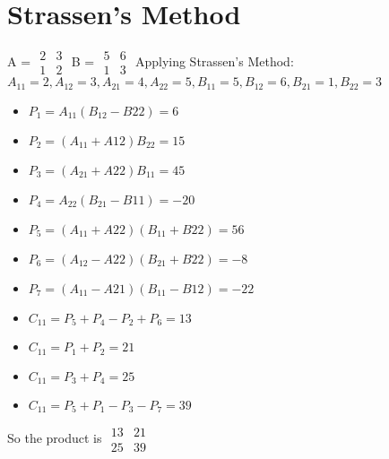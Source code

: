 \documentclass[12pt]{article}
\begin{document}
\section{Strassen’s Method}
A = $\begin{matrix}
    2 & 3 \\ 1 & 2
\end{matrix}$  
B = $\begin{matrix}
    5 & 6 \\ 1 & 3
\end{matrix}$
\newline
Applying Strassen's Method: $A_{11}=2, A_{12}=3, A_{21}=4, A_{22}=5, B_{11}=5, B_{12}=6, B_{21}=1, B_{22}=3$
\begin{itemize}
    \item $P_1=A_{11}(B_{12}-B{22})=6$
    \item $P_2=(A_{11}+A{12})B_{22}=15$
    \item $P_3=(A_{21}+A{22})B_{11}=45$
    \item $P_4=A_{22}(B_{21}-B{11})=-20$
    \item $P_5=(A_{11}+A{22})(B_{11}+B{22})=56$
    \item $P_6=(A_{12}-A{22})(B_{21}+B{22})=-8$
    \item $P_7=(A_{11}-A{21})(B_{11}-B{12})=-22$
    \item $C_{11}=P_{5}+P_{4}-P_{2}+P_{6}=13$
    \item $C_{11}=P_{1}+P_{2}=21$
    \item $C_{11}=P_{3}+P_{4}=25$
    \item $C_{11}=P_{5}+P_{1}-P_{3}-P_{7}=39$
\end{itemize}
So the product is $\begin{matrix}
    13 & 21 \\ 25 & 39
\end{matrix}$  
\end{document}
